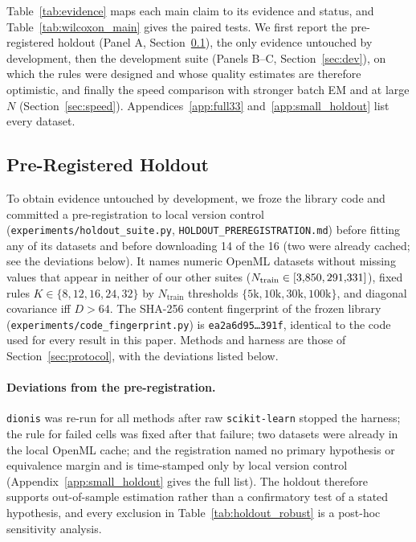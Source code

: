 \documentclass[10pt]{article} %
\begin{document}
Table~\ref{tab:evidence} maps each main claim to its evidence and status, and Table~\ref{tab:wilcoxon_main} gives the paired tests. We first report the pre-registered holdout (Panel A, Section~\ref{sec:holdout}), the only evidence untouched by development, then the development suite (Panels B--C, Section~\ref{sec:dev}), on which the rules were designed and whose quality estimates are therefore optimistic, and finally the speed comparison with stronger batch EM and at large $N$ (Section~\ref{sec:speed}). Appendices~\ref{app:full33} and~\ref{app:small_holdout} list every dataset.

\subsection{Pre-Registered Holdout}
\label{sec:holdout}

To obtain evidence untouched by development, we froze the library code and committed a pre-registration to local version control (\texttt{experiments/holdout\_suite.py}, \texttt{HOLDOUT\_PREREGISTRATION.md}) before fitting any of its datasets and before downloading 14 of the 16 (two were already cached; see the deviations below). It names \rnHoldout{} numeric OpenML datasets without missing values that appear in neither of our other suites ($N_{\mathrm{train}} \in [3{,}850, 291{,}331]$), fixed rules $K \in \{8, 12, 16, 24, 32\}$ by $N_{\mathrm{train}}$ thresholds $\{5\text{k}, 10\text{k}, 30\text{k}, 100\text{k}\}$, and diagonal covariance iff $D > 64$. The SHA-256 content fingerprint of the frozen library (\texttt{experiments/code\_fingerprint.py}) is \texttt{ea2a6d95\ldots391f}, identical to the code used for every result in this paper. Methods and harness are those of Section~\ref{sec:protocol}, with the deviations listed below.

\paragraph{Deviations from the pre-registration.} \texttt{dionis} was re-run for all methods after raw \texttt{scikit-learn} stopped the harness; the rule for failed cells was fixed after that failure; two datasets were already in the local OpenML cache; and the registration named no primary hypothesis or equivalence margin and is time-stamped only by local version control (Appendix~\ref{app:small_holdout} gives the full list). The holdout therefore supports out-of-sample estimation rather than a confirmatory test of a stated hypothesis, and every exclusion in Table~\ref{tab:holdout_robust} is a post-hoc sensitivity analysis.
\end{document}
